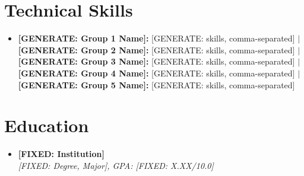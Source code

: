 \documentclass[letterpaper,10pt]{article}
\newcommand{\resumeSubheading}[4]{
\item
\textbf{#1} \hfill \textbf{\small #2} \\
\textit{\small #3} \hfill \textit{\small #4}
\vspace{-4pt}
}
\begin{document}
\vspace{-14pt}
\section{Technical Skills}
\begin{itemize}[leftmargin=*]
\item \textbf{[GENERATE: Group 1 Name]:} [GENERATE: skills, comma-separated] $|$
\textbf{[GENERATE: Group 2 Name]:} [GENERATE: skills, comma-separated] $|$
\textbf{[GENERATE: Group 3 Name]:} [GENERATE: skills, comma-separated] $|$
\textbf{[GENERATE: Group 4 Name]:} [GENERATE: skills, comma-separated] $|$
\textbf{[GENERATE: Group 5 Name]:} [GENERATE: skills, comma-separated]
\end{itemize}

\vspace{-10pt}
\section{Education}
\begin{itemize}[leftmargin=0in, label={}]
\resumeSubheading
{[FIXED: Institution]}{}
{[FIXED: Degree, Major], GPA: [FIXED: X.XX/10.0]}{}
\end{itemize}
\end{document}
